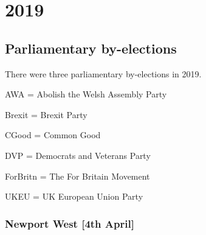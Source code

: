 \renewcommand\resultsyear{2019}

\part{2019}

%
%

%
%


\chapter{Parliamentary by-elections}

There were three parliamentary by-elections in 2019.

AWA = Abolish the Welsh Assembly Party

Brexit = Brexit Party

CGood = Common Good

DVP = Democrats and Veterans Party

ForBritn = The For Britain Movement

UKEU = UK European Union Party

\section*{Newport West \hspace*{\fill}\nolinebreak[1]%
	\enspace\hspace*{\fill}
	[4th April]}

